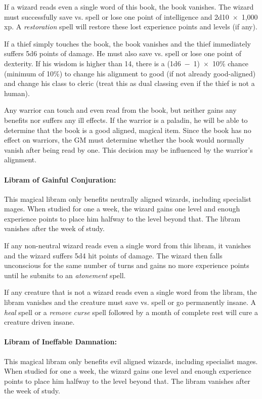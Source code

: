 \begin{multicols}{2}
If a wizard reads even a single word of this book, the book vanishes.  The wizard must successfully save vs. spell or lose one point of intelligence and 2d10~$\times$~1,000 xp.  A \textit{restoration} spell will restore these lost experience points and levels (if any).  

If a thief simply touches the book, the book vanishes and the thief immediately suffers 5d6 points of damage.  He must also save vs. spell or lose one point of dexterity.  If his wisdom is higher than 14, there is a (1d6~$-$~1)~$\times$~10\% chance (minimum of 10\%) to change his alignment to good (if not already good-aligned) and change his class to cleric (treat this as dual classing even if the thief is not a human).  

Any warrior can touch and even read from the book, but neither gains any benefits nor suffers any ill effects.  If the warrior is a paladin, he will be able to determine that the book is a good aligned, magical item.  Since the book has no effect on warriors, the GM must determine whether the book would normally vanish after being read by one.  This decision may be influenced by the warrior's alignment.

\paragraph{Libram of Gainful Conjuration:} This magical libram only benefits neutrally aligned wizards, including specialist mages.  When studied for one a week, the wizard gains one level and enough experience points to place him halfway to the level beyond that.  The libram vanishes after the week of study.

If any non-neutral wizard reads even a single word from this libram, it vanishes and the wizard suffers 5d4 hit points of damage.  The wizard then falls unconscious for the same number of turns and gains no more experience points until he submits to an \textit{atonement} spell.  

If any creature that is not a wizard reads even a single word from the libram, the libram vanishes and the creature must save vs. spell or go permanently insane.  A \textit{heal} spell or a \textit{remove curse} spell followed by a month of complete rest will cure a creature driven insane.

\paragraph{Libram of Ineffable Damnation:} This magical libram only benefits evil aligned wizards, including specialist mages.  When studied for one a week, the wizard gains one level and enough experience points to place him halfway to the level beyond that.  The libram vanishes after the week of study.  


\end{multicols}
